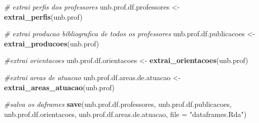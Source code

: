 \documentclass[]{article}
\newenvironment{Shaded}{\begin{snugshade}}{\end{snugshade}}
\newcommand{\KeywordTok}[1]{\textcolor[rgb]{0.13,0.29,0.53}{\textbf{#1}}}
\newcommand{\DataTypeTok}[1]{\textcolor[rgb]{0.13,0.29,0.53}{#1}}
\newcommand{\StringTok}[1]{\textcolor[rgb]{0.31,0.60,0.02}{#1}}
\newcommand{\CommentTok}[1]{\textcolor[rgb]{0.56,0.35,0.01}{\textit{#1}}}
\newcommand{\NormalTok}[1]{#1}
\begin{document}
\begin{Shaded}
\begin{Highlighting}[]
\CommentTok{# extrai perfis dos professores }
\NormalTok{unb.prof.df.professores <-}\StringTok{ }\KeywordTok{extrai_perfis}\NormalTok{(unb.prof)}

\CommentTok{# extrai producao bibliografica de todos os professores }
\NormalTok{unb.prof.df.publicacoes <-}\StringTok{ }\KeywordTok{extrai_producoes}\NormalTok{(unb.prof)}

\CommentTok{#extrai orientacoes }
\NormalTok{unb.prof.df.orientacoes <-}\StringTok{ }\KeywordTok{extrai_orientacoes}\NormalTok{(unb.prof)}

\CommentTok{#extrai areas de atuacao }
\NormalTok{unb.prof.df.areas.de.atuacao <-}\StringTok{ }\KeywordTok{extrai_areas_atuacao}\NormalTok{(unb.prof)}

\CommentTok{#salva os daframes }
\KeywordTok{save}\NormalTok{(unb.prof.df.professores, unb.prof.df.publicacoes,}
\NormalTok{     unb.prof.df.orientacoes, unb.prof.df.areas.de.atuacao, }\DataTypeTok{file =} \StringTok{"dataframes.Rda"}\NormalTok{)}


\end{Highlighting}
\end{Shaded}
\end{document}
